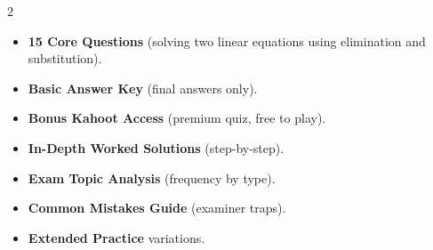 \documentclass[11pt,a4paper]{article}
\newcommand{\FullReleaseDate}{April 30, 2026}
\begin{document}
\vspace{8pt}

\begin{multicols}{2}
  \begin{tcolorbox}[card, title=\sffamily\bfseries\textcolor{white}{\faHandPointDown\ TODAY (Simplified Version)}, colbacktitle=mainblue, boxed title style={sharp corners, boxrule=0pt}]
    \begin{itemize}[leftmargin=1.2em, itemsep=2pt]
      \item \small \textbf{15 Core Questions} (solving two linear equations using elimination and substitution).
      \item \small \textbf{Basic Answer Key} (final answers only).
      \item \small \textbf{Bonus Kahoot Access} (premium quiz, free to play).
    \end{itemize}
  \end{tcolorbox}

  \columnbreak

  \begin{tcolorbox}[card, title=\sffamily\bfseries\textcolor{white}{\faRocket\ ON \FullReleaseDate\ (Full Upgrade)}, colbacktitle=mainblue, boxed title style={sharp corners, boxrule=0pt}]
    \begin{itemize}[leftmargin=1.2em, itemsep=2pt]
      \item \small \textbf{In-Depth Worked Solutions} (step-by-step).
      \item \small \textbf{Exam Topic Analysis} (frequency by type).
      \item \small \textbf{Common Mistakes Guide} (examiner traps).
      \item \small \textbf{Extended Practice} variations.
    \end{itemize}
  \end{tcolorbox}
\end{multicols}
\end{document}
